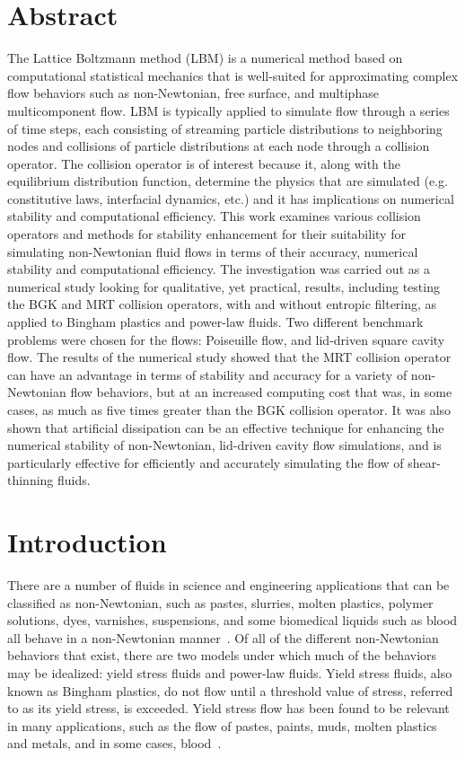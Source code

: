 \section*{Abstract}

The Lattice Boltzmann method (LBM) is a numerical method based on computational statistical mechanics that is well-suited for approximating complex flow behaviors such as non-Newtonian, free surface, and multiphase multicomponent flow.
LBM is typically applied to simulate flow through a series of time steps, each consisting of streaming particle distributions to neighboring nodes and collisions of particle distributions at each node through a collision operator.
The collision operator is of interest because it, along with the equilibrium distribution function, determine the physics that are simulated (e.g. constitutive laws, interfacial dynamics, etc.) and it has implications on numerical stability and computational efficiency.
This work examines various collision operators and methods for stability enhancement for their suitability for simulating non-Newtonian fluid flows in terms of their accuracy, numerical stability and computational efficiency.
The investigation was carried out as a numerical study looking for qualitative, yet practical, results, including testing the BGK and MRT collision operators, with and without entropic filtering, as applied to Bingham plastics and power-law fluids.
Two different benchmark problems were chosen for the flows: Poiseuille flow, and lid-driven square cavity flow.
The results of the numerical study showed that the MRT collision operator can have an advantage in terms of stability and accuracy for a variety of non-Newtonian flow behaviors, but at an increased computing cost that was, in some cases, as much as five times greater than the BGK collision operator.
It was also shown that artificial dissipation can be an effective technique for enhancing the numerical stability of non-Newtonian, lid-driven cavity flow simulations, and is particularly effective for efficiently and accurately simulating the flow of shear-thinning fluids.

\section{Introduction}

There are a number of fluids in science and engineering applications that can be classified as non-Newtonian, such as pastes, slurries, molten plastics, polymer solutions, dyes, varnishes, suspensions, and some biomedical liquids such as blood all behave in a non-Newtonian manner~\cite{bohme1987non}.
Of all of the different non-Newtonian behaviors that exist, there are two models under which much of the behaviors may be idealized: yield stress fluids and power-law fluids.
Yield stress fluids, also known as Bingham plastics, do not flow until a threshold value of stress, referred to as its yield stress, is exceeded.
Yield stress flow has been found to be relevant in many applications, such as the flow of pastes, paints, muds, molten plastics and metals, and in some cases, blood~\cite{wang2011lattice}.


